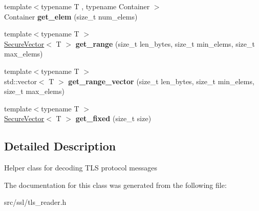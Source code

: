 \begin{DoxyCompactItemize}
\item 
\hypertarget{classBotan_1_1TLS__Data__Reader_a210cf01040c4c0331f1ceda6e49e404d}{{\footnotesize template$<$typename T , typename Container $>$ }\\Container {\bfseries get\-\_\-elem} (size\-\_\-t num\-\_\-elems)}\label{classBotan_1_1TLS__Data__Reader_a210cf01040c4c0331f1ceda6e49e404d}

\item 
\hypertarget{classBotan_1_1TLS__Data__Reader_a4ce5e9a82f855bea72df7455d330d9b6}{{\footnotesize template$<$typename T $>$ }\\\hyperlink{classBotan_1_1SecureVector}{Secure\-Vector}$<$ T $>$ {\bfseries get\-\_\-range} (size\-\_\-t len\-\_\-bytes, size\-\_\-t min\-\_\-elems, size\-\_\-t max\-\_\-elems)}\label{classBotan_1_1TLS__Data__Reader_a4ce5e9a82f855bea72df7455d330d9b6}

\item 
\hypertarget{classBotan_1_1TLS__Data__Reader_a724ca643247f9e8bde47837ccebd1a1c}{{\footnotesize template$<$typename T $>$ }\\std\-::vector$<$ T $>$ {\bfseries get\-\_\-range\-\_\-vector} (size\-\_\-t len\-\_\-bytes, size\-\_\-t min\-\_\-elems, size\-\_\-t max\-\_\-elems)}\label{classBotan_1_1TLS__Data__Reader_a724ca643247f9e8bde47837ccebd1a1c}

\item 
\hypertarget{classBotan_1_1TLS__Data__Reader_ac3a616c8bdd7e03ea26f26270d7d5311}{{\footnotesize template$<$typename T $>$ }\\\hyperlink{classBotan_1_1SecureVector}{Secure\-Vector}$<$ T $>$ {\bfseries get\-\_\-fixed} (size\-\_\-t size)}\label{classBotan_1_1TLS__Data__Reader_ac3a616c8bdd7e03ea26f26270d7d5311}

\end{DoxyCompactItemize}


\subsection{Detailed Description}
Helper class for decoding T\-L\-S protocol messages 

The documentation for this class was generated from the following file\-:\begin{DoxyCompactItemize}
\item 
src/ssl/tls\-\_\-reader.\-h\end{DoxyCompactItemize}
